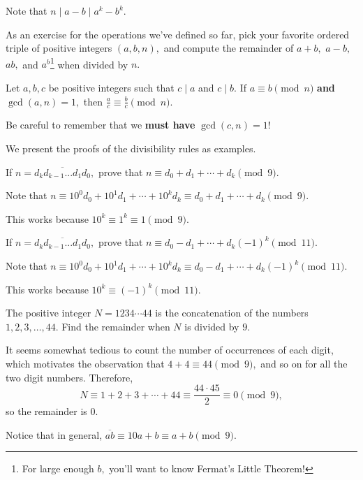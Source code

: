 \documentclass[mast]{lucky}
\begin{document}
\begin{pro}
Note that $n\mid a-b\mid a^k-b^k.$
\end{pro}

As an exercise for the operations we've defined so far, pick your favorite ordered triple of positive integers $(a,b,n),$ and compute the remainder of $a+b,$ $a-b,$ $ab,$ and $a^b$\footnote{For large enough $b,$ you'll want to know Fermat's Little Theorem!} when divided by $n.$

\begin{fact}[Dividing]
Let $a,b,c$ be positive integers such that $c\mid a$ and $c\mid b.$ If $a\equiv b\pmod{n}$ \textbf{and} $\gcd(a,n)=1,$ then $\frac{a}{c}\equiv\frac{b}{c}\pmod{n}.$
\end{fact}

Be careful to remember that we \textbf{must have} $\gcd(c,n)=1$!

We present the proofs of the divisibility rules as examples.

\begin{exam}
If $n=\overline{d_{k}d_{k-1}...d_{1}d_{0}},$ prove that $n\equiv d_0+d_1+\cdots+d_{k}\pmod{9}.$
\end{exam}

\begin{sol}
Note that $n\equiv 10^0d_0+10^1d_1+\cdots+10^{k}d_{k}\equiv d_0+d_1+\cdots+d_k\pmod{9}.$

This works because $10^k\equiv 1^k\equiv 1\pmod{9}.$
\end{sol}

\begin{exam}
If $n=\overline{d_{k}d_{k-1}...d_{1}d_{0}},$ prove that $n\equiv d_0-d_1+\cdots+d_{k}(-1)^k\pmod{11}.$
\end{exam}

\begin{sol}
Note that $n\equiv 10^0d_0+10^1d_1+\cdots+10^{k}d_{k}\equiv d_0-d_1+\cdots+d_k(-1)^k\pmod{11}.$

This works because $10^k\equiv (-1)^k\pmod{11}.$
\end{sol}

\begin{exam}
The positive integer $N=1234\cdots44$ is the concatenation of the numbers $1,2,3,\ldots,44.$ Find the remainder when $N$ is divided by $9.$
\end{exam}

\begin{sol}
It seems somewhat tedious to count the number of occurrences of each digit, which motivates the observation that $4+4\equiv 44\pmod{9},$ and so on for all the two digit numbers. Therefore,
\[N\equiv 1+2+3+\cdots+44\equiv\frac{44\cdot 45}{2}\equiv 0\pmod{9},\]
so the remainder is $0.$
\end{sol}
Notice that in general, $\overline{ab}\equiv 10a+b\equiv a+b\pmod{9}.$
\end{document}

